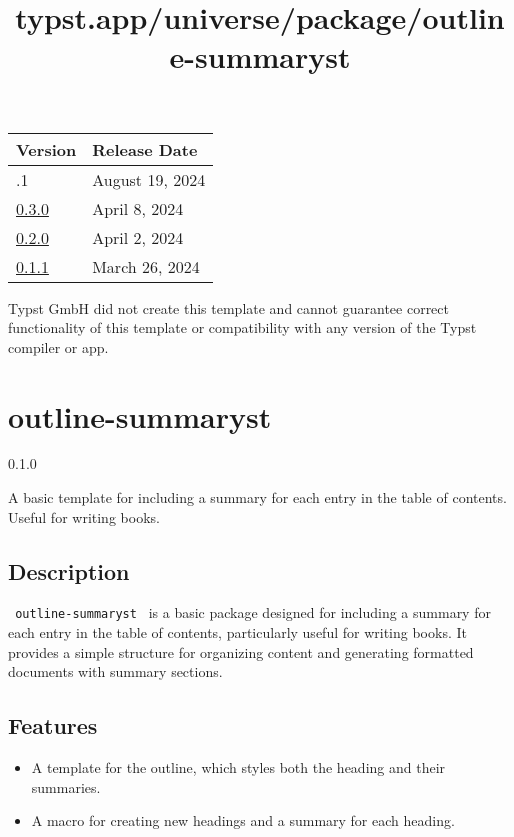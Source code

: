 \begin{longtable}[]{@{}ll@{}}
\toprule\noalign{}
Version & Release Date \\
\midrule\noalign{}
\endhead
\bottomrule\noalign{}
\endlastfoot
0.3.1 & August 19, 2024 \\
\href{https://typst.app/universe/package/starter-journal-article/0.3.0/}{0.3.0}
& April 8, 2024 \\
\href{https://typst.app/universe/package/starter-journal-article/0.2.0/}{0.2.0}
& April 2, 2024 \\
\href{https://typst.app/universe/package/starter-journal-article/0.1.1/}{0.1.1}
& March 26, 2024 \\
\end{longtable}

Typst GmbH did not create this template and cannot guarantee correct
functionality of this template or compatibility with any version of the
Typst compiler or app.


\title{typst.app/universe/package/outline-summaryst}

\label{banner}
\section{outline-summaryst}\label{outline-summaryst}

{ 0.1.0 }

A basic template for including a summary for each entry in the table of
contents. Useful for writing books.

\label{readme}
\subsection{Description}\label{description}

\texttt{\ outline-summaryst\ } is a basic package designed for including
a summary for each entry in the table of contents, particularly useful
for writing books. It provides a simple structure for organizing content
and generating formatted documents with summary sections.

\subsection{Features}\label{features}

\begin{itemize}
\tightlist
\item
  A template for the outline, which styles both the heading and their
  summaries.
\item
  A macro for creating new headings and a summary for each heading.
\end{itemize}

